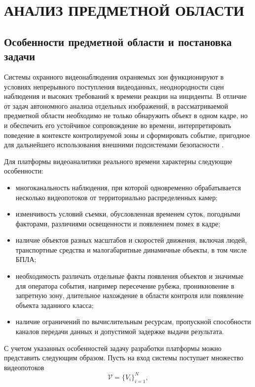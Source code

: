 \chapter{АНАЛИЗ ПРЕДМЕТНОЙ ОБЛАСТИ}
\label{ch:problem_statement}

\section{Особенности предметной области и постановка задачи}

Системы охранного видеонаблюдения охраняемых зон функционируют в условиях непрерывного поступления видеоданных, неоднородности сцен наблюдения и высоких требований к времени реакции на инциденты. В отличие от задач автономного анализа отдельных изображений, в рассматриваемой предметной области необходимо не только обнаружить объект в одном кадре, но и обеспечить его устойчивое сопровождение во времени, интерпретировать поведение в контексте контролируемой зоны и сформировать событие, пригодное для дальнейшего использования внешними подсистемами безопасности \cite{redmon2016yolo,wojke2017deepsort,transactional_outbox}.

Для платформы видеоаналитики реального времени характерны следующие особенности:
\begin{itemize}
    \item многоканальность наблюдения, при которой одновременно обрабатывается несколько видеопотоков от территориально распределенных камер;
    \item изменчивость условий съемки, обусловленная временем суток, погодными факторами, различиями освещенности и появлением помех в кадре;
    \item наличие объектов разных масштабов и скоростей движения, включая людей, транспортные средства и малогабаритные динамичные объекты, в том числе БПЛА;
    \item необходимость различать отдельные факты появления объектов и значимые для оператора события, например пересечение рубежа, проникновение в запретную зону, длительное нахождение в области контроля или появление объекта заданного класса;
    \item наличие ограничений по вычислительным ресурсам, пропускной способности каналов передачи данных и допустимой задержке выдачи результата.
\end{itemize}

С учетом указанных особенностей задачу разработки платформы можно представить следующим образом. Пусть на вход системы поступает множество видеопотоков
\begin{equation}
\mathcal{V} = \{V_i\}_{i=1}^{N},
\end{equation}
\where
{}


